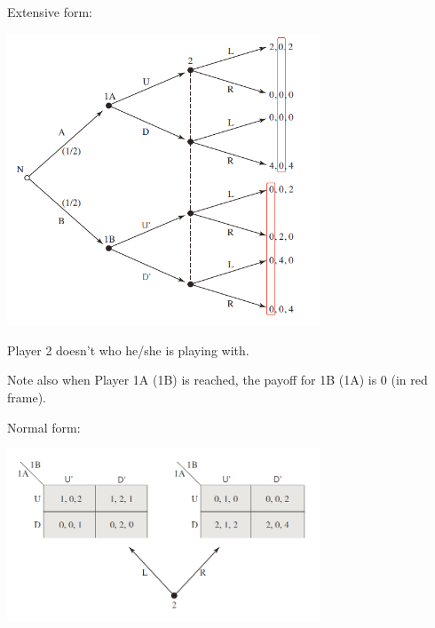 \documentclass{article}
\begin{document}
\vspace{4mm}

Extensive form:

\begin{center}
\includegraphics[width=0.7\textwidth]{9.q26_3_b1}
\end{center}
\vspace{2mm}

\begin{mdframed}[backgroundcolor=blue!20,linecolor=white]
Player 2 doesn't who he/she is playing with.
\vspace{2mm}

Note also when Player 1A (1B) is reached, the payoff for 1B (1A) is 0 (in red frame).
\end{mdframed}


\vspace{4mm}

Normal form:

\begin{center}
\includegraphics[width=0.7\textwidth]{9.q26_3_b2}
\end{center}
\vspace{2mm}
\end{document}
